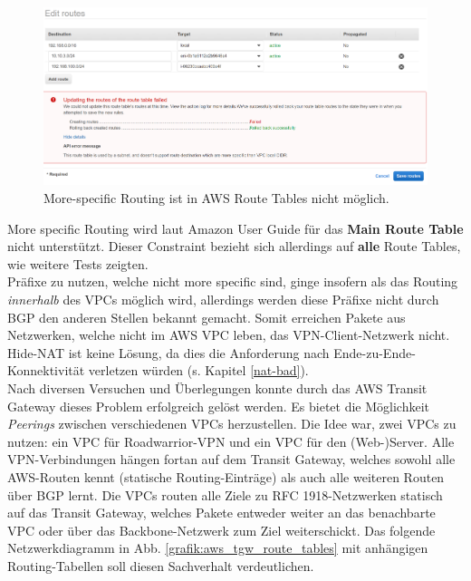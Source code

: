 \begin{figure}[h]
  \centering
  \includegraphics[scale=0.35]{Figures/more_specific_not_allowed_aws.PNG}
  \caption{More-specific Routing ist in AWS Route Tables nicht möglich.}
  \label{grafik:more_specific_not_allowed_aws}
\end{figure}\FloatBarrier
More specific Routing wird laut Amazon User Guide für das \textbf{Main Route Table} nicht unterstützt\cite[S.230]{awsug2020}. Dieser Constraint bezieht sich allerdings auf \textbf{alle} Route Tables, wie weitere Tests zeigten.\\
Präfixe zu nutzen, welche nicht more specific sind, ginge insofern als das Routing \textit{innerhalb} des \gls{VPC}s möglich wird, allerdings werden diese Präfixe nicht durch \gls{BGP} den anderen Stellen bekannt gemacht. Somit erreichen Pakete aus Netzwerken, welche nicht im AWS \gls{VPC} \glqq leben\grqq{}, das VPN-\gls{Client}-Netzwerk nicht.\\
Hide-NAT ist keine Lösung, da dies die Anforderung nach Ende-zu-Ende-Konnektivität verletzen würden (s. Kapitel \ref{nat-bad}).\\
Nach diversen Versuchen und Überlegungen konnte durch das AWS Transit Gateway dieses Problem erfolgreich gelöst werden. Es bietet die Möglichkeit \textit{Peerings} zwischen verschiedenen \gls{VPC}s herzustellen. Die Idee war, zwei \gls{VPC}s zu nutzen: ein \gls{VPC} für \gls{Roadwarrior}-\gls{VPN} und ein \gls{VPC} für den (Web-)Server. Alle \gls{VPN}-Verbindungen hängen fortan auf dem Transit Gateway, welches sowohl alle AWS-Routen kennt (statische Routing-Einträge) als auch alle weiteren Routen über \gls{BGP} lernt. Die \gls{VPC}s routen alle Ziele zu \gls{RFC} 1918-Netzwerken statisch auf das Transit Gateway, welches Pakete entweder weiter an das benachbarte \gls{VPC} oder über das Backbone-Netzwerk zum Ziel weiterschickt. Das folgende Netzwerkdiagramm in Abb. \ref{grafik:aws_tgw_route_tables} mit anhängigen Routing-Tabellen soll diesen Sachverhalt verdeutlichen.

